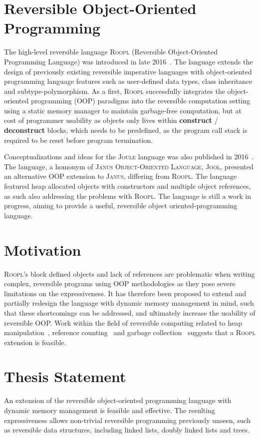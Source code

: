 \section{Reversible Object-Oriented Programming}
\label{sec:reversible-object-oriented-programming}
The high-level reversible language \textsc{Roopl} (Reversible Object-Oriented Programming Language) was introduced in late 2016~\cite{th:roopl, th:roopl2}. The language extends the design of previously existing reversible imperative languages with object-oriented programming language features such as user-defined data types, class inheritance and subtype-polymorphism. As a first, \textsc{Roopl} successfully integrates the object-oriented programming (OOP) paradigms into the reversible computation setting using a static memory manager to maintain garbage-free computation, but at cost of programmer usability as objects only lives within \textbf{construct} / \textbf{deconstruct} blocks, which needs to be predefined, as the program call stack is required to be reset before program termination.

Conceptualizations and ideas for the \textsc{Joule} language was also published in 2016~\cite{us:joule}. The language, a homonym of \textsc{Janus Object-Oriented Language}, \textsc{Jool}, presented an alternative OOP extension to \textsc{Janus}, differing from \textsc{Roopl}. The language featured heap allocated objects with constructors and multiple object references, as such also addressing the problems with \textsc{Roopl}. The language is still a work in progress, aiming to provide a useful, reversible object oriented-programming language.
 

\section{Motivation}
\label{sec:motivation}
\textsc{Roopl}'s block defined objects and lack of references are problematic when writing complex, reversible programs using OOP methodologies as they pose severe limitations on the expressiveness. It has therefore been proposed to extend and partially redesign the language with dynamic memory management in mind, such that these shortcomings can be addressed, and ultimately increase the usability of reversible OOP. Work within the field of reversible computing related to heap manipulation~\cite{ha:heap}, reference counting~\cite{tm:refcounting} and garbage collection~\cite{tm:garbage} suggests that a \textsc{Roopl} extension is feasible.


\section{Thesis Statement}
\label{sec:thesis-statement}
An extension of the reversible object-oriented programming language with dynamic memory management is feasible and effective. The resulting expressiveness allows non-trivial reversible programming previously unseen, such as reversible data structures, including linked lists, doubly linked lists and trees.

